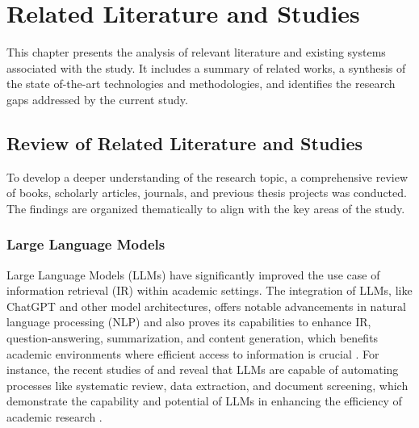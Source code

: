 \chapter{Related Literature and Studies}
\begin{refsection}

This chapter presents the analysis of relevant literature and existing systems associated with the study. It includes a summary of related works, a synthesis of the state of-the-art technologies and methodologies, and identifies the research gaps addressed by the current study.

\section{Review of Related Literature and Studies}
To develop a deeper understanding of the research topic, a comprehensive review of books, scholarly articles, journals, and previous thesis projects was conducted. The findings are organized thematically to align with the key areas of the study.

\subsection{Large Language Models}

Large Language Models (LLMs) have significantly improved the use case of information retrieval (IR) within academic settings. The integration of LLMs, like ChatGPT and other model architectures, offers notable advancements in natural language processing (NLP) and also proves its capabilities to enhance IR, question-answering, summarization, and content generation, which benefits academic environments where efficient access to information is crucial \cite{yalamanchili2024quality} \cite{yang2023large}. For instance, the recent studies of \citeauthor{khraisha2024can} \citeyear{khraisha2024can} and \citeauthor{gartlehner2023data} \citeyear{gartlehner2023data} reveal that LLMs are capable of automating processes like systematic review, data extraction, and document screening, which demonstrate the capability and potential of LLMs in enhancing the efficiency of academic research \cite{khraisha2024can}  \cite{gartlehner2023data}.


\end{refsection}

